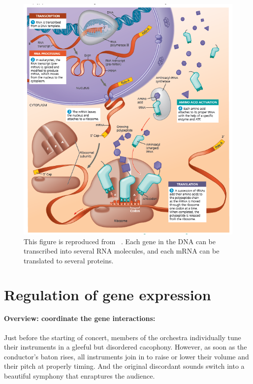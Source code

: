 \begin{figure}[p]
     \centering
     \includegraphics[width=\textwidth]{figures/from-DNA-to-protein.png}
    \caption[A schematic view of the process involved in protein production from an eukaryotic gene.]{
    This figure is reproduced from ~\autocite[Fig.~17.25, p.~356]{campbell_etal20}. Each gene in the DNA can be transcribed into several RNA molecules, and each mRNA can be translated to several proteins.}
    \label{fig:from-DNA-to-protein}
\end{figure}


\section{Regulation of gene expression}
\label{sec:gene-regulation}
\paragraph{Overview: coordinate the gene interactions:}
Just before the starting of concert, members of the orchestra individually tune their instruments in a gleeful but disordered cacophony. However, as soon as the conductor’s baton rises, all instruments join in to raise or lower their volume and their pitch at properly timing. And the original discordant sounds switch into a beautiful symphony that enraptures the audience.

